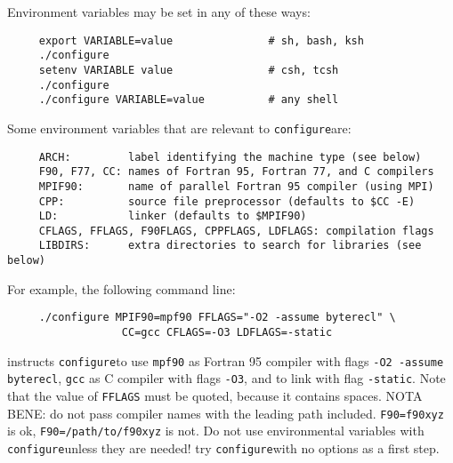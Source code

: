 \documentclass[12pt,a4paper]{article}
\def\configure{\texttt{configure}}
\begin{document}
Environment variables may be set in any of these ways:
\begin{verbatim}
     export VARIABLE=value               # sh, bash, ksh
     ./configure
     setenv VARIABLE value               # csh, tcsh
     ./configure
     ./configure VARIABLE=value          # any shell
\end{verbatim}
Some environment variables that are relevant to \configure are:
\begin{verbatim}
     ARCH:         label identifying the machine type (see below)
     F90, F77, CC: names of Fortran 95, Fortran 77, and C compilers
     MPIF90:       name of parallel Fortran 95 compiler (using MPI)
     CPP:          source file preprocessor (defaults to $CC -E)
     LD:           linker (defaults to $MPIF90)
     CFLAGS, FFLAGS, F90FLAGS, CPPFLAGS, LDFLAGS: compilation flags
     LIBDIRS:      extra directories to search for libraries (see below)
\end{verbatim}
For example, the following command line:
\begin{verbatim}
     ./configure MPIF90=mpf90 FFLAGS="-O2 -assume byterecl" \
                  CC=gcc CFLAGS=-O3 LDFLAGS=-static
\end{verbatim}
instructs \configure to use \texttt{mpf90} as Fortran 95 compiler 
with flags \texttt{-O2 -assume byterecl}, \texttt{gcc} as C compiler with 
flags \texttt{-O3}, and to link with flag \texttt{-static}. 
Note that the value of \texttt{FFLAGS} must be quoted, because it contains
spaces. NOTA BENE: do not pass compiler names with the leading path
included. \texttt{F90=f90xyz} is ok, \texttt{F90=/path/to/f90xyz} is not. 
Do not use
environmental variables with \configure unless they are needed! try
\configure with no options as a first step.
\end{document}
